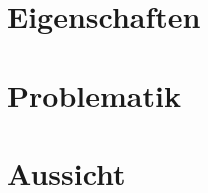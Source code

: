 \documentclass[a4paper, 12pt]{article} %
\begin{document}
\clearpage

\section{Eigenschaften}


\begin{spacing}{1.8}  %
\fontsize{14pt}{15pt}\selectfont  %


\end{spacing}

\clearpage

\section{Problematik}


\begin{spacing}{1.8}  %
\fontsize{14pt}{15pt}\selectfont  %


\end{spacing}

\clearpage

\section{Aussicht}


\begin{spacing}{1.8}  %
\fontsize{14pt}{15pt}\selectfont  %


\end{spacing}

\clearpage
\begingroup
\renewcommand{\bibfont}{\fontsize{13pt}{12pt}\selectfont}  
\sloppy
\printbibliography
\endgroup
\end{document}
